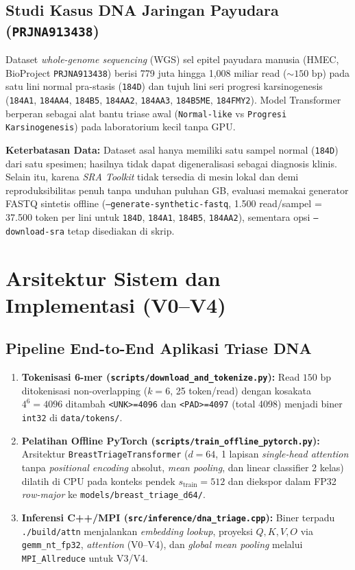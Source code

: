 \documentclass[11pt,a4paper]{article}
\begin{document}
\subsection{Studi Kasus DNA Jaringan Payudara (\texttt{PRJNA913438})}
Dataset \textit{whole-genome sequencing} (WGS) sel epitel payudara manusia (HMEC, BioProject \texttt{PRJNA913438}) \cite{park2023} berisi 779 juta hingga 1,008 miliar read ($\sim 150\text{ bp}$) pada satu lini normal pra-stasis (\texttt{184D}) dan tujuh lini seri progresi karsinogenesis (\texttt{184A1}, \texttt{184AA4}, \texttt{184B5}, \texttt{184AA2}, \texttt{184AA3}, \texttt{184B5ME}, \texttt{184FMY2}). Model Transformer berperan sebagai alat bantu triase awal (\texttt{Normal-like} vs \texttt{Progresi Karsinogenesis}) pada laboratorium kecil tanpa GPU.

\textbf{Keterbatasan Data:} Dataset asal hanya memiliki satu sampel normal (\texttt{184D}) dari satu spesimen; hasilnya tidak dapat digeneralisasi sebagai diagnosis klinis. Selain itu, karena \emph{SRA Toolkit} tidak tersedia di mesin lokal dan demi reproduksibilitas penuh tanpa unduhan puluhan GB, evaluasi memakai generator FASTQ sintetis offline (\texttt{--generate-synthetic-fastq}, 1.500 read/sampel = 37.500 token per lini untuk \texttt{184D}, \texttt{184A1}, \texttt{184B5}, \texttt{184AA2}), sementara opsi \texttt{--download-sra} tetap disediakan di skrip.

\section{Arsitektur Sistem dan Implementasi (V0--V4)}

\subsection{Pipeline End-to-End Aplikasi Triase DNA}
\begin{enumerate}
  \item \textbf{Tokenisasi 6-mer (\texttt{scripts/download\_and\_tokenize.py}):} Read $150\text{ bp}$ ditokenisasi non-overlapping ($k=6$, 25 token/read) dengan kosakata $4^6=4096$ ditambah \texttt{<UNK>=4096} dan \texttt{<PAD>=4097} (total 4098) menjadi biner \texttt{int32} di \texttt{data/tokens/}.
  \item \textbf{Pelatihan Offline PyTorch (\texttt{scripts/train\_offline\_pytorch.py}):} Arsitektur \texttt{BreastTriageTransformer} ($d=64$, 1 lapisan \emph{single-head attention} tanpa \emph{positional encoding} absolut, \emph{mean pooling}, dan linear classifier 2 kelas) dilatih di CPU pada konteks pendek $s_{\mathrm{train}}=512$ dan diekspor dalam FP32 \emph{row-major} ke \texttt{models/breast\_triage\_d64/}.
  \item \textbf{Inferensi C++/MPI (\texttt{src/inference/dna\_triage.cpp}):} Biner terpadu \texttt{./build/attn} menjalankan \emph{embedding lookup}, proyeksi $Q,K,V,O$ via \texttt{gemm\_nt\_fp32}, \emph{attention} (V0--V4), dan \emph{global mean pooling} melalui \texttt{MPI\_Allreduce} untuk V3/V4.
\end{enumerate}
\end{document}
